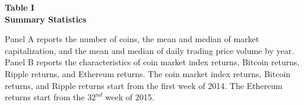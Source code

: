 \documentclass{article}
\begin{document}
    \begin{center}
        \textbf{
        Table I
        \\
        Summary Statistics
        }
    \end{center}
    \begin{justify}
        \footnotesize{
        Panel A reports the number of coins, the mean and median of market capitalization, and the mean and median of daily trading price volume by year. Panel B reports the characteristics of coin market index returns, Bitcoin returns, Ripple returns, and Ethereum returns. The coin market index returns, Bitcoin returns, and Ripple returns start from the first week of 2014. The Ethereum returns start from the $32^{nd}$ week of 2015.
        }
    \end{justify}
    \-
    \noindent{}
\end{document}
